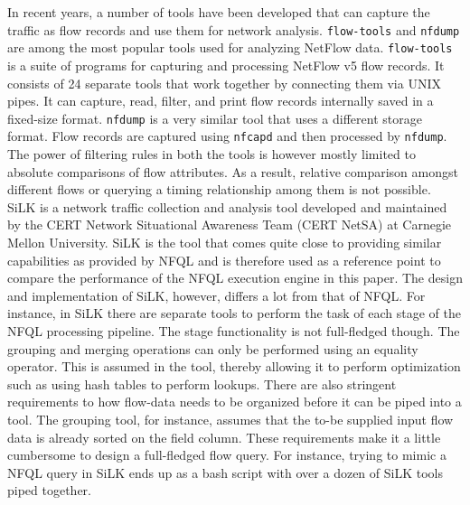 
In recent years, a number of tools have been developed that can capture the
traffic as flow records and use them for network analysis. \texttt{flow-tools}
and \texttt{nfdump} are among the most popular tools used for analyzing
NetFlow data. \texttt{flow-tools} \cite{sromig:2000} is a suite of programs
for capturing and processing NetFlow v5 flow records. It consists of 24
separate tools that work together by connecting them via UNIX pipes. It can
capture, read, filter, and print flow records internally saved in a fixed-size
format. \texttt{nfdump} \cite{phaag:2006} is a very similar tool that uses a
different storage format. Flow records are captured using \texttt{nfcapd} and
then processed by \texttt{nfdump}. The power of filtering rules in both the
tools is however mostly limited to absolute comparisons of flow attributes. As
a result, relative comparison amongst different flows or querying a timing
relationship among them is not possible.  SiLK \cite{SiLK} is a network
traffic collection and analysis tool developed and maintained by the CERT
Network Situational Awareness Team (CERT NetSA) at Carnegie Mellon University.
SiLK is the tool that comes quite close to providing similar capabilities as
provided by \ac{NFQL} and is therefore used as a reference point to compare
the performance of the \ac{NFQL} execution engine in this paper. The design
and implementation of SiLK, however, differs a lot from that of \ac{NFQL}. For
instance, in SiLK there are separate tools to perform the task of each stage
of the \ac{NFQL} processing pipeline. The stage functionality is not
full-fledged though. The grouping and merging operations can only be performed
using an equality operator. This is assumed in the tool, thereby allowing it
to perform optimization such as using hash tables to perform lookups. There
are also stringent requirements to how flow-data needs to be organized before
it can be piped into a tool. The grouping tool, for instance, assumes that the
to-be supplied input flow data is already sorted on the field column.  These
requirements make it a little cumbersome to design a full-fledged flow query.
For instance, trying to mimic a \ac{NFQL} query in SiLK ends up as a bash
script with over a dozen of SiLK tools piped together.
